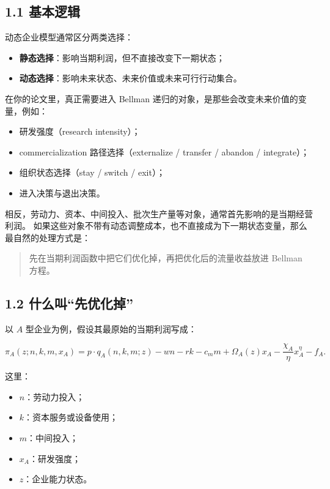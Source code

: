 \documentclass[12pt,fontset=none]{ctexart}
\begin{document}
\subsection{1.1 基本逻辑}

动态企业模型通常区分两类选择：

\begin{itemize}[leftmargin=2em]
    \item \textbf{静态选择}：影响当期利润，但不直接改变下一期状态；
    \item \textbf{动态选择}：影响未来状态、未来价值或未来可行行动集合。
\end{itemize}

在你的论文里，真正需要进入 Bellman 递归的对象，是那些会改变未来价值的变量，例如：

\begin{itemize}[leftmargin=2em]
    \item 研发强度（research intensity）；
    \item commercialization 路径选择（externalize / transfer / abandon / integrate）；
    \item 组织状态选择（stay / switch / exit）；
    \item 进入决策与退出决策。
\end{itemize}

相反，劳动力、资本、中间投入、批次生产量等对象，通常首先影响的是当期经营利润。
如果这些对象不带有动态调整成本，也不直接成为下一期状态变量，那么最自然的处理方式是：

\begin{quote}
先在当期利润函数中把它们优化掉，再把优化后的流量收益放进 Bellman 方程。
\end{quote}

\subsection{1.2 什么叫“先优化掉”}

以 \(A\) 型企业为例，假设其最原始的当期利润写成：

\[
\pi_A(z;n,k,m,x_A)
=
p\cdot q_A(n,k,m;z)
-wn-rk-c_m m
+\Omega_A(z)x_A
-\frac{\chi_A}{\eta}x_A^\eta
-f_A.
\]

这里：

\begin{itemize}[leftmargin=2em]
    \item \(n\)：劳动力投入；
    \item \(k\)：资本服务或设备使用；
    \item \(m\)：中间投入；
    \item \(x_A\)：研发强度；
    \item \(z\)：企业能力状态。
\end{itemize}
\end{document}
